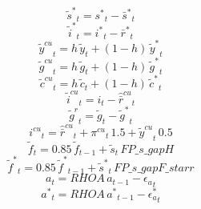 \begin{dmath}
{{\tilde s^*}}_{t}={{s^*}}_{t}-{{\bar s^*}}_{t}
\end{dmath}
\begin{dmath}
{{\tilde i^*}}_{t}={{i^*}}_{t}-{{\bar r^*}}_{t}
\end{dmath}
\begin{dmath}
{{\tilde y^{cu}}}_{t}={{h}}\, {{\tilde y}}_{t}+\left(1-{{h}}\right)\, {{\tilde y^*}}_{t}
\end{dmath}
\begin{dmath}
{{\tilde g^{cu}}}_{t}={{h}}\, {{\tilde g}}_{t}+\left(1-{{h}}\right)\, {{\tilde g^*}}_{t}
\end{dmath}
\begin{dmath}
{{\tilde c^{cu}}}_{t}={{h}}\, {{\tilde c}}_{t}+\left(1-{{h}}\right)\, {{\tilde c^*}}_{t}
\end{dmath}
\begin{dmath}
{{\tilde i^{cu}}}_{t}={{i}}_{t}-{{\hat {\bar r}^{cu}}}_{t}
\end{dmath}
\begin{dmath}
{{\tilde g^{r}}}_{t}={{\tilde g}}_{t}-{{\tilde g^*}}_{t}
\end{dmath}
\begin{dmath}
{{i^{cu}}}_{t}={{\hat {\bar r}^{cu}}}_{t}+{{\pi^{cu}}}_{t}\, 1.5+{{\tilde y^{cu}}}_{t}\, 0.5
\end{dmath}
\begin{dmath}
{{\tilde f}}_{t}=0.85\, {{\tilde f}}_{t-1}+{{\tilde s}}_{t}\, {FP\_s\_gapH}
\end{dmath}
\begin{dmath}
{{\tilde f^*}}_{t}=0.85\, {{\tilde f^*}}_{t-1}+{{\tilde s^*}}_{t}\, {FP\_s\_gapF\_starr}
\end{dmath}
\begin{dmath}
{{a}}_{t}={RHOA}\, {{a}}_{t-1}-{{\epsilon_a}}_{t}
\end{dmath}
\begin{dmath}
{{a^*}}_{t}={RHOA}\, {{a^*}}_{t-1}-{{\epsilon_a^*}}_{t}
\end{dmath}
